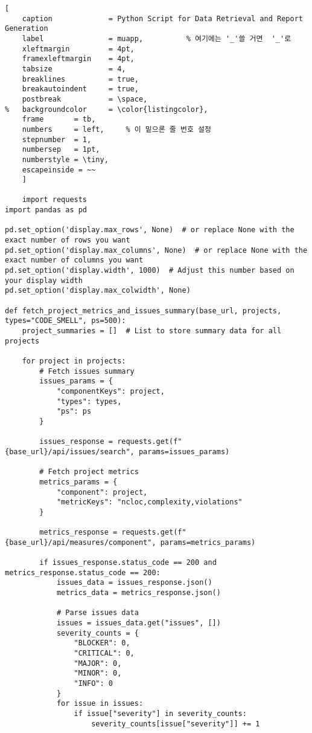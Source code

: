 \begin{lstlisting}[
	caption				= Python Script for Data Retrieval and Report Generation
	label				= muapp,          % 여기에는 '_'쓸 거면  '_'로
	xleftmargin			= 4pt,
	framexleftmargin	= 4pt,
	tabsize				= 4,
	breaklines			= true,
	breakautoindent		= true,
	postbreak			= \space,
%	backgroundcolor		= \color{listingcolor}, 
	frame		= tb,
	numbers		= left,		% 이 밑으론 줄 번호 설정
	stepnumber	= 1,
	numbersep	= 1pt,
	numberstyle	= \tiny,
	escapeinside = ~~
	]	

    import requests
import pandas as pd

pd.set_option('display.max_rows', None)  # or replace None with the exact number of rows you want
pd.set_option('display.max_columns', None)  # or replace None with the exact number of columns you want
pd.set_option('display.width', 1000)  # Adjust this number based on your display width
pd.set_option('display.max_colwidth', None)

def fetch_project_metrics_and_issues_summary(base_url, projects, types="CODE_SMELL", ps=500):
    project_summaries = []  # List to store summary data for all projects

    for project in projects:
        # Fetch issues summary
        issues_params = {
            "componentKeys": project,
            "types": types,
            "ps": ps
        }

        issues_response = requests.get(f"{base_url}/api/issues/search", params=issues_params)

        # Fetch project metrics
        metrics_params = {
            "component": project,
            "metricKeys": "ncloc,complexity,violations"
        }

        metrics_response = requests.get(f"{base_url}/api/measures/component", params=metrics_params)

        if issues_response.status_code == 200 and metrics_response.status_code == 200:
            issues_data = issues_response.json()
            metrics_data = metrics_response.json()

            # Parse issues data
            issues = issues_data.get("issues", [])
            severity_counts = {
                "BLOCKER": 0,
                "CRITICAL": 0,
                "MAJOR": 0,
                "MINOR": 0,
                "INFO": 0
            }
            for issue in issues:
                if issue["severity"] in severity_counts:
                    severity_counts[issue["severity"]] += 1


\end{lstlisting}

